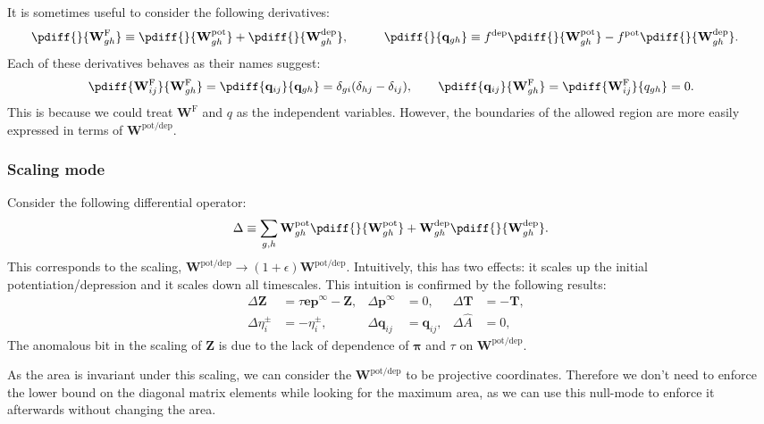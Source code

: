 \documentclass{article} %
\newcommand{\onev}{\mathbf{e}}
\newcommand{\pr}{\mathbf{p}}
\newcommand{\eq}{\pr^\infty}
\newcommand{\fpt}{\mathbf{T}}
\newcommand{\fund}{\mathbf{Z}}
\newcommand{\pib}{\boldsymbol{\pi}}
\newcommand{\W}{\mathbf{W}}
\newcommand{\enc}{\mathbf{q}}
\newcommand{\frg}{\W^{\mathrm{F}}}
\newcommand{\pot}{^{\text{pot}}}
\newcommand{\dep}{^{\text{dep}}}
\newcommand{\potdep}{^{\text{pot/dep}}}
\begin{document}
It is sometimes useful to consider the following derivatives:
%
\begin{equation}\label{eq:derivqw}
  \begin{aligned}
    \pdiff{}{\frg_{gh}} &\equiv     \pdiff{}{\W\pot _{gh}} +     \pdiff{}{\W\dep _{gh}} ,&\qquad
    \pdiff{}{\enc_{gh}}    &\equiv f\dep  \pdiff{}{\W\pot _{gh}} - f\pot  \pdiff{}{\W\dep _{gh}} .
  \end{aligned}
\end{equation}
%
Each of these derivatives behaves as their names suggest:
%
\begin{equation}\label{eq:derivqweff}
  \pdiff{\frg_{ij}}{\frg_{gh}} = \pdiff{\enc_{ij}}{\enc_{gh}}
  =  \delta_{gi}(\delta_{hj}-\delta_{ij}),
  \qquad
  \pdiff{\enc_{ij}}{\frg_{gh}} = \pdiff{\frg_{ij}}{q_{gh}}  = 0.
\end{equation}
%
This is because we could treat $\frg$ and $q$ as the independent variables. However, the boundaries of the allowed region are more easily expressed in terms of $\W\potdep $.


\subsubsection{Scaling mode}\label{sec:rescale}

Consider the following differential operator:
%
\begin{equation}\label{eq:scaleop}
  \Delta \equiv \sum_{g,h} \W\pot _{gh}\pdiff{}{\W\pot _{gh}} + \W\dep _{gh}\pdiff{}{\W\dep _{gh}}.
\end{equation}
%
This corresponds to the scaling, $\W\potdep  \to (1+\epsilon)\W\potdep $.
Intuitively, this has two effects: it scales up the initial potentiation/depression and it scales down all timescales.
This intuition is confirmed by the following results:
%
\begin{equation}\label{eq:scaleeffects}
  \begin{aligned}
    \Delta \fund &= \tau\onev\eq - \fund ,&
    \Delta \eq  &= 0 ,&
    \Delta \fpt  &= -\fpt ,
    \\
    \Delta \eta^\pm_i  &= - \eta^\pm_i ,&
    \Delta \enc_{ij} &= \enc_{ij} ,&
    \Delta \hat{A}  &= 0 ,&
  \end{aligned}
\end{equation}
%
The anomalous bit in the scaling of $\fund$ is due to the lack of dependence of $\pib$ and $\tau$ on $\W\potdep $.

As the area is invariant under this scaling, we can consider the $\W\potdep $ to be projective coordinates.
Therefore we don't need to enforce the lower bound on the diagonal matrix elements while looking for the maximum area, as we can use this null-mode to enforce it afterwards without changing the area.
\end{document}

